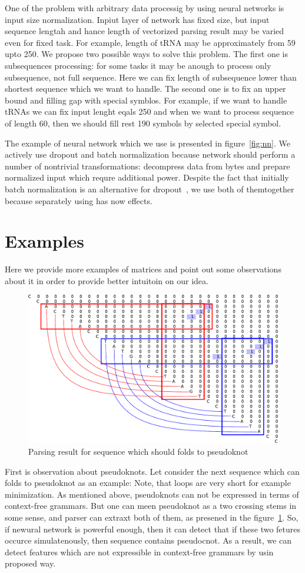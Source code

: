 \documentclass[a4paper,twoside]{article}
\begin{document}
One of the problem with arbitrary data processig by using neural networks is input size normalization.
Inpiut layer of network has fixed size, but input sequence lengtah and hance length of vectorized parsing result may be varied even for fixed task.
For example, length of tRNA may be approximately from 59 upto 250.
We propose two possible ways to solve this problem.
The first one is subsequences processing: for some tasks it may be anough to process only subsequence, not full sequence.
Here we can fix length of subsequence lower than shortest sequence which we want to handle. 
The second one is to fix an upper bound and filling gap with special symblos.
For example, if we want to handle tRNAs we can fix input lenght eqals 250 and when we want to process sequence of length 60, then we should fill rest 190 symbols by selected special symbol.

The example of neural network which we use is presented in figure~\ref{fig:nn}.
We actively use dropout and batch normalization because network should perform a number of nontrivial transformations: decompress data from bytes and  prepare normalized input which requre additional power.
Despite the fact that initially batch normalization is an alternative for dropout~\cite{DBLP:journals:corr:IoffeS15}, we use both of themtogether because separately using has now effects.

\section{Examples}
\label{sec:examples}

\noindent Here we provide more examples of matrices and point out some observations about it in order to provide better intuitoin on our idea.

\begin{figure}
\centering
\includegraphics[width=.45\textwidth]{figures/5.pdf}
\caption{Parsing result for sequence which should folds to pseudoknot}
\label{fig:pseudoknot}
\end{figure}

First is observation about pseudoknots. 
Let consider the next sequence which can folds to pseudoknot as an example: {}
Note, that loops are very short for example minimization.
As mentioned above, pseudoknots can not be expressed in terms of context-free grammars. 
But one can meen pseudoknot as a two crossing stems in some sense, and parser can extraxt both of them, as presened in the figure~\ref{fig:pseudoknot}.
So, if newural network is powerful enough, then it can detect that if these two fetures occurce simulatenously, then sequence contains pseudocnot.
As a result, we can detect features which are not expressible in context-free grammars by usin proposed way.
\end{document}
